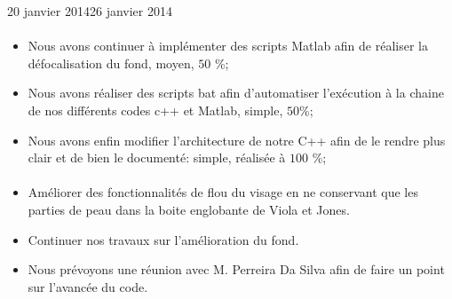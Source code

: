 \documentclass[12pt]{fiche-rd-info}
\begin{document}
\begin{fichesuivi}{20 janvier 2014}{26 janvier 2014}
\paragraph{}
	\begin{travaileffectue}
		\begin{itemize}
			\item Nous avons continuer à implémenter des scripts Matlab afin de réaliser la défocalisation du fond, moyen, $50$ \%;
			\item Nous avons réaliser des scripts bat afin d'automatiser l'exécution à la chaine de nos différents codes c++ et Matlab, simple, $50$\%;
			\item Nous avons enfin modifier l'architecture de notre C++ afin de le rendre plus clair et de bien le documenté: simple, réalisée à $100$ \%;
		\end{itemize}
	\end{travaileffectue}


\paragraph*{}
	\begin{planification}
		\begin{itemize}
			\item Améliorer des fonctionnalités de flou du visage en ne conservant que les parties de peau dans la boite englobante de Viola et Jones.
			\item Continuer nos travaux sur l'amélioration du fond.	
			\item Nous prévoyons une réunion avec M. Perreira Da Silva afin de faire un point sur l'avancée du code.
\end{itemize}
	\end{planification}
\end{fichesuivi}
\end{document}
